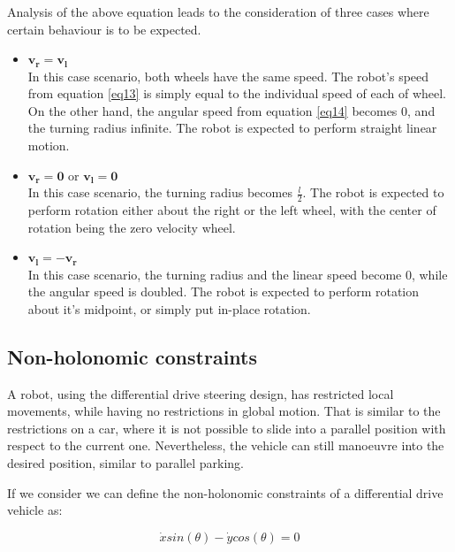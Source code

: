 Analysis of the above equation leads to the consideration of three cases where certain behaviour is to be expected.

\begin{itemize} \label{list_v}

\item $\boldsymbol{v_r = v_l}$ \\ In this case scenario, both wheels have the same speed. The robot's speed from equation \ref{eq13} is simply equal to the individual speed of each of wheel. On the other hand, the angular speed from equation \ref{eq14} becomes 0, and the turning radius infinite. The robot is expected to perform straight linear motion.

\item $\boldsymbol{v_r = 0}$ or $\boldsymbol{v_l = 0}$ \\ In this case scenario, the turning radius becomes $\frac{l}{2}$. The robot is expected to perform rotation either about the right or the left wheel, with the center of rotation being the zero velocity wheel. 

\item $\boldsymbol{v_l = -v_r}$ \\ In this case scenario, the turning radius and the linear speed become 0, while the angular speed is doubled. The robot is expected to perform rotation about it's midpoint, or simply put in-place rotation.

\end{itemize}

\subsection{Non-holonomic constraints} 

A robot, using the differential drive steering design, has restricted local movements, while having no restrictions in global motion.  That is similar to the restrictions on a car, where it is not possible to slide into a parallel position with respect to the current one. Nevertheless, the vehicle can still manoeuvre into the desired position, similar to parallel parking. 

If we consider  we can define the non-holonomic constraints of a differential drive vehicle as: 

\begin{equation} \label{eq4}
\dot{x}sin(\theta) - \dot{y}cos(\theta) = 0
\end{equation}

